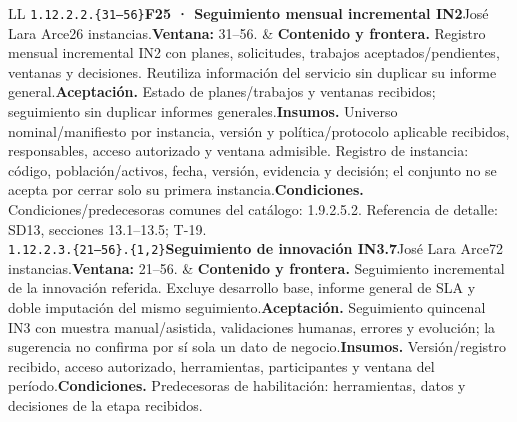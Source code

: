 \begin{longtable}{L{\tabcolsep\relax}L{\tabcolsep\relax}}
\texttt{1.\allowbreak{}12.\allowbreak{}2.\allowbreak{}2.\allowbreak{}\{31--56\}}\newline{}\textbf{F25 · Seguimiento mensual incremental IN2}\newline{}José Lara Arce\newline{}26 instancias.\newline{}\textbf{Ventana:} 31--56. & \textbf{Contenido y frontera.} Registro mensual incremental IN2 con planes, solicitudes, trabajos aceptados/pendientes, ventanas y decisiones. Reutiliza información del servicio sin duplicar su informe general.\newline{}\textbf{Aceptación.} Estado de planes/trabajos y ventanas recibidos; seguimiento sin duplicar informes generales.\newline{}\textbf{Insumos.} Universo nominal/manifiesto por instancia, versión y política/protocolo aplicable recibidos, responsables, acceso autorizado y ventana admisible. Registro de instancia: código, población/activos, fecha, versión, evidencia y decisión; el conjunto no se acepta por cerrar solo su primera instancia.\newline{}\textbf{Condiciones.} Condiciones/predecesoras comunes del catálogo: 1.9.2.5.2. Referencia de detalle: SD13, secciones 13.1--13.5; T-19.\\\hline
\texttt{1.\allowbreak{}12.\allowbreak{}2.\allowbreak{}3.\allowbreak{}\{21--56\}.\allowbreak{}\{1,\allowbreak{}2\}}\newline{}\textbf{Seguimiento de innovación IN3.7}\newline{}José Lara Arce\newline{}72 instancias.\newline{}\textbf{Ventana:} 21--56. & \textbf{Contenido y frontera.} Seguimiento incremental de la innovación referida. Excluye desarrollo base, informe general de SLA y doble imputación del mismo seguimiento.\newline{}\textbf{Aceptación.} Seguimiento quincenal IN3 con muestra manual/asistida, validaciones humanas, errores y evolución; la sugerencia no confirma por sí sola un dato de negocio.\newline{}\textbf{Insumos.} Versión/registro recibido, acceso autorizado, herramientas, participantes y ventana del período.\newline{}\textbf{Condiciones.} Predecesoras de habilitación: herramientas, datos y decisiones de la etapa recibidos.\\\hline

\end{longtable}
